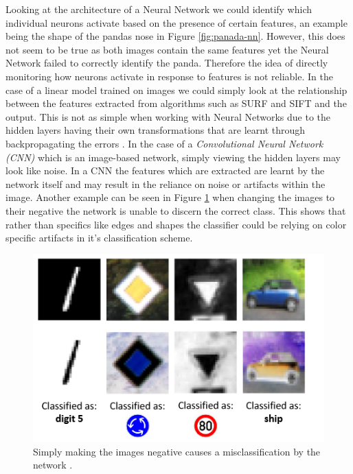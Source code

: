 Looking at the architecture of a Neural Network we could identify which individual neurons activate based on the presence of certain features, an example being the shape of the pandas nose in Figure \ref{fig:panada-nn}. However, this does not seem to be true as both images contain the same features yet the Neural Network failed to correctly identify the panda. Therefore the idea of directly monitoring how neurons activate in response to features is not reliable. In the case of a linear model trained on images we could simply look at the relationship between the features extracted from algorithms such as SURF \cite{10.1016/j.cviu.2007.09.014} and SIFT \cite{Wu2013ACS} and the output. This is not as simple when working with Neural Networks due to the hidden layers having their own transformations that are learnt through backpropagating the errors \cite{10.5555/65669.104451}\cite{10.5555/525960}. In the case of a \emph{Convolutional Neural Network (CNN)} \cite{DBLP:journals/corr/Schmidhuber14} which is an image-based network, simply viewing the hidden layers may look like noise. In a CNN the features which are extracted are learnt by the network itself and may result in the reliance on noise or artifacts within the image. Another example can be seen in Figure \ref{fig:negative-nn} when changing the images to their negative the network is unable to discern the correct class. This shows that rather than specifics like edges and shapes the classifier could be relying on color specific artifacts in it's classification scheme.
\begin  {figure}[!htpb]
  \includegraphics[width=\linewidth]{Introduction_Images/NN-negative.png}
   \caption {Simply making the images negative causes a misclassification by the network \cite{DBLP:journals/corr/HosseiniP17}.}
    \label{fig:negative-nn}
\end{figure}
